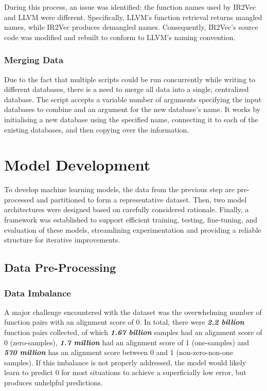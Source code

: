 During this process, an issue was identified: the function names used by IR2Vec and LLVM were different. Specifically, LLVM's function retrieval returns mangled names, while IR2Vec produces demangled names. Consequently, IR2Vec's source code was modified and rebuilt to conform to LLVM's naming convention.


\subsubsection{Merging Data}
Due to the fact that multiple scripts could be run concurrently while writing to different databases, there is a need to merge all data into a single, centralized database. The script accepts a variable number of arguments specifying the input databases to combine and an argument for the new database's name. It works by initialising a new database using the specified name, connecting it to each of the existing databases, and then copying over the information.

\section{Model Development}
To develop machine learning models, the data from the previous step are pre-processed and partitioned to form a representative dataset. Then, two model architectures were designed based on carefully considered rationale. Finally, a framework was established to support efficient training, testing, fine-tuning, and evaluation of these models, streamlining experimentation and providing a reliable structure for iterative improvements.

\subsection{Data Pre-Processing}
\subsubsection{Data Imbalance}
A major challenge encountered with the dataset was the overwhelming number of function pairs with an alignment score of 0. In total, there were \textbf{\textit{2.2 billion}} function pairs collected, of which \textbf{\textit{1.67 billion}} samples had an alignment score of 0 (zero-samples), \textbf{\textit{1.7 million}} had an alignment score of 1 (one-samples) and \textbf{\textit{570 million}} has an alignment score between 0 and 1 (non-zero-non-one samples). If this imbalance is not properly addressed, the model would likely learn to predict 0 for most situations to achieve a superficially low error, but produces unhelpful predictions.

